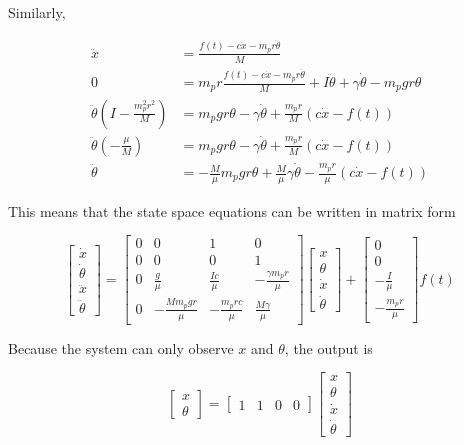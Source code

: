 \documentclass{journal}
\begin{document}
Similarly,

\begin{align*}
	\ddot{x} &= \frac{f(t) - c \dot{x} - m_p r \ddot{\theta}}{M} \\
	0 &= m_p r \frac{f(t) - c \dot{x} - m_p r \ddot{\theta}}{M} + I \ddot{\theta} + \gamma \dot{\theta} - m_p g r \theta \\
	\ddot{\theta} \left( I - \frac{m_p^2 r^2}{M} \right) &= m_p g r \theta - \gamma \dot{\theta} + \frac{m_p r}{M} (c\dot{x} - f(t)) \\
	\ddot{\theta} \left( -\frac{\mu}{M} \right) &= m_p g r \theta - \gamma \dot{\theta} + \frac{m_p r}{M} (c\dot{x} - f(t)) \\
	\ddot{\theta} &= - \frac{M}{\mu} m_p g r \theta + \frac{M}{\mu} \gamma \dot{\theta} - \frac{m_p r}{\mu} (c \dot{x} - f(t))
\end{align*}

This means that the state space equations can be written in matrix form

$$
\begin{bmatrix} \dot{x} \\ \dot{\theta} \\ \ddot{x} \\ \ddot{\theta} \end{bmatrix} = \begin{bmatrix} 
	0 & 0 & 1 & 0 \\
	0 & 0 & 0 & 1 \\
	0 & \frac{g}{\mu} & \frac{Ic}{\mu} & - \frac{\gamma m_p r}{\mu} \\
	0 & -\frac{M m_p g r}{\mu} & - \frac{m_p r c}{\mu} & \frac{M \gamma}{\mu}
 \end{bmatrix}
 \begin{bmatrix} x \\ \theta \\ \dot{x} \\ \dot{\theta} \end{bmatrix}
 +
 \begin{bmatrix} 0 \\ 0 \\ -\frac{I}{\mu} \\ - \frac{m_p r}{\mu} \end{bmatrix} f(t)
 $$

Because the system can only observe $x$ and $\theta$, the output is 

$$ \begin{bmatrix} x \\ \theta \end{bmatrix} = \begin{bmatrix} 1 & 1 & 0 & 0 \end{bmatrix} \begin{bmatrix} x \\ \theta \\ \dot{x} \\ \dot{\theta} \end{bmatrix} $$
\end{document}
